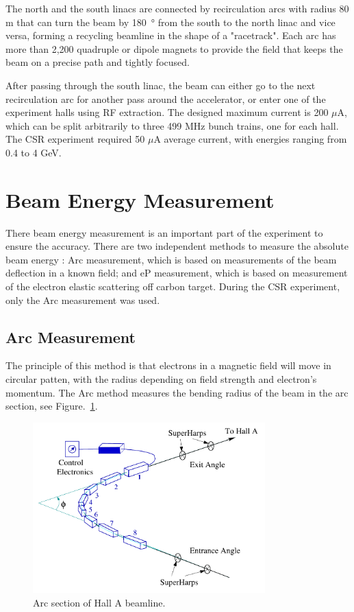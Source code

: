 The north and the south linacs are connected by recirculation arcs with radius 80 m that can turn the beam by
\SI{180}{\degree} from the south to the north linac and vice versa, forming a recycling beamline in the shape
of a "racetrack". Each arc has more than 2,200 quadruple or dipole magnets to provide the field that keeps the beam on a precise
path and tightly focused.

After passing through the south linac, the beam can either go to the next recirculation arc for another pass around the accelerator, or enter one of the
experiment halls using RF extraction. The designed maximum current is 200 $\mu$A, which can be split arbitrarily to
three 499 MHz bunch trains, one for each hall.  The CSR experiment required 50 $\mu$A average current, with energies ranging from 0.4 to 4 GeV.


\section{Beam Energy Measurement}
There beam energy measurement is an important part of the experiment to ensure the accuracy. There are two independent
methods to measure the absolute beam energy :  Arc measurement, which is based on measurements of the beam deflection in
a known field; and eP measurement, which is based on measurement of the electron elastic scattering off carbon target.  
During the CSR experiment, only the Arc measurement was used.

\subsection{Arc Measurement}
The principle of this method is that electrons in a magnetic field will move in circular patten, with the radius
depending on field strength and electron's momentum. The Arc method measures the bending radius of the beam in the
arc section, see Figure.~\ref{fig:arc-measurement}. 

\begin{figure}[tb!]
\centering
\includegraphics[width=0.8\textwidth]{figs/arc-measurement.pdf}
\caption[Arc Measurement]{Arc section of Hall A beamline.  \label{fig:arc-measurement}}
\end{figure}

